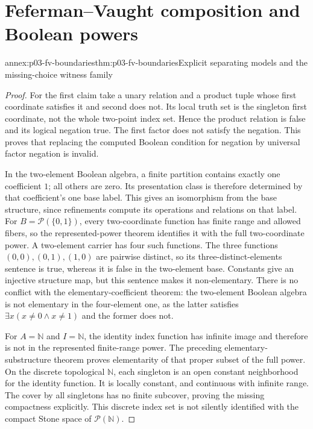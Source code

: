 \section{Feferman--Vaught composition and Boolean powers}

\begin{annexitem}{annex:p03-fv-boundaries}{thm:p03-fv-boundaries}{Explicit separating models and the missing-choice witness family}
\begin{proof}
For the first claim take a unary relation and a product tuple whose first
coordinate satisfies it and second does not. Its local truth set is the
singleton first coordinate, not the whole two-point index set. Hence the
product relation is false and its logical negation true. The first factor
does not satisfy the negation. This proves that replacing the computed
Boolean condition for negation by universal factor negation is invalid.

In the two-element Boolean algebra, a finite partition contains exactly
one coefficient \(1\); all others are zero. Its presentation class is
therefore determined by that coefficient's one base label. This gives an
isomorphism from the base structure, since refinements compute its operations
and relations on that label. For \(B=\mathcal P(\{0,1\})\), every
two-coordinate function has finite range and allowed fibers, so the
represented-power theorem identifies it with the full two-coordinate power.
A two-element carrier has four such functions. The three functions
\((0,0),(0,1),(1,0)\) are pairwise distinct, so its three-distinct-elements
sentence is true, whereas it is false in the two-element base. Constants
give an injective structure map, but this sentence makes it non-elementary.
There is no conflict with the elementary-coefficient theorem: the two-element
Boolean algebra is not elementary in the four-element one, as the latter
satisfies \(\exists x(x\ne0\land x\ne1)\) and the former does not.

For \(A=\mathbb N\) and \(I=\mathbb N\), the identity index function
has infinite image and therefore is not in the represented finite-range
power. The preceding elementary-substructure theorem proves elementarity
of that proper subset of the full power. On the discrete topological
\(\mathbb N\), each singleton is an open constant neighborhood for the
identity function. It is locally constant, and continuous with infinite
range. The cover by all singletons has no finite subcover, proving the
missing compactness explicitly. This discrete index set is not silently
identified with the compact Stone space of \(\mathcal P(\mathbb N)\).


\end{proof}
\end{annexitem}
